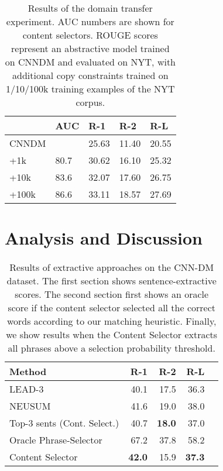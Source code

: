 \documentclass[11pt,a4paper]{article}
\begin{document}
\begin{table}[t]
\centering
{}
\begin{tabular}{@{}lllll@{}}
\toprule
 & AUC & R-1 & R-2 & R-L \\ \midrule
CNNDM &  & 25.63 & 11.40 & 20.55 \\
+1k & 80.7 & 30.62 & 16.10 & 25.32 \\
+10k & 83.6 & 32.07 & 17.60 & 26.75 \\
+100k & 86.6 & 33.11 & 18.57 & 27.69 \\ \bottomrule
\end{tabular}
\caption{Results of the domain transfer experiment. AUC numbers are shown for content selectors. ROUGE scores represent an abstractive model trained on \gls{CNNDM} and evaluated on NYT, with additional copy constraints trained on 1/10/100k training examples of the NYT corpus. }
\label{tab:nyt}
\end{table}

\section{Analysis and Discussion}



\begin{table}[t]
\centering
{}
\begin{tabular}{@{}lrrrr@{}}
\toprule
Method                & R-1   & R-2  & R-L  \\ \midrule
LEAD-3                & 40.1  & 17.5 & 36.3 \\
\small{NEUSUM} \citep{zhou2018neural} & 41.6  & 19.0 & 38.0 \\
Top-3 sents (Cont. Select.)    & 40.7  & \textbf{18.0} & 37.0 \\ \midrule
Oracle Phrase-Selector       & 67.2  & 37.8 & 58.2 \\
Content Selector             & \textbf{42.0}  & 15.9 & \textbf{37.3} \\ \bottomrule
\end{tabular}
\caption{Results of extractive approaches on the CNN-DM dataset. The first section shows sentence-extractive scores. The second section first shows an oracle score if the content selector selected all the correct words according to our matching heuristic. Finally, we show results when the Content Selector extracts all phrases above a selection probability threshold.}
\label{tab:ext}
\end{table}
\end{document}
